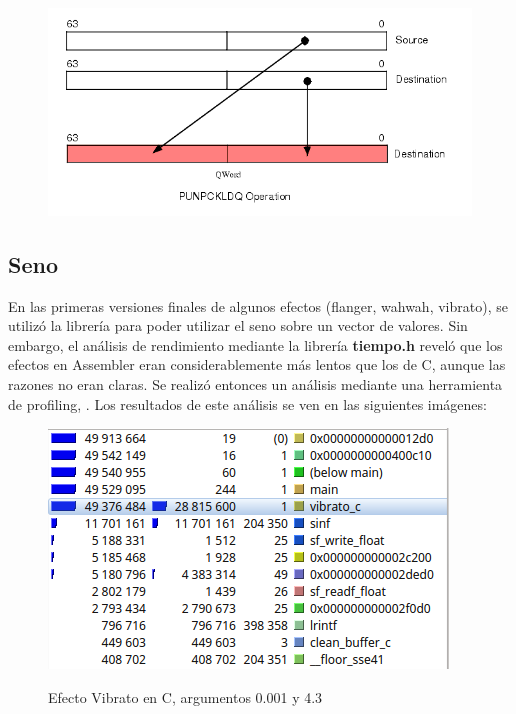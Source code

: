 \begin{figure}[H]
    \centering
    \includegraphics[scale=0.75]{imagenes/punpckldq.png}
    \label{fig:punpckldq}
    \caption{ }
\end{figure}

\subsection{Seno}
\label{subsec:desarrollo-problemas-seno}
En las primeras versiones finales de algunos efectos (flanger, wahwah, vibrato), se utilizó la librería  para poder utilizar el seno sobre un vector de valores. Sin embargo, el análisis de rendimiento mediante la librería \textbf{tiempo.h} reveló que los efectos en Assembler eran considerablemente más lentos que los de C, aunque las razones no eran claras. Se realizó entonces un análisis mediante una herramienta de profiling, . Los resultados de este análisis se ven en las siguientes imágenes:

\begin{figure}[H]
    \centering
    \includegraphics[scale=0.8]{imagenes/callgrind-c.png}
    \label{fig:callgrind-c-26787}
    \caption{Efecto Vibrato en C, argumentos 0.001 y 4.3}
\end{figure}

